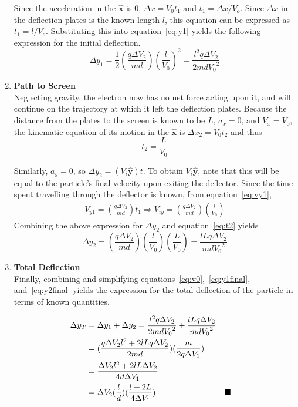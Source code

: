 \documentclass[twocolumn,english]{IEEEtran}
\theoremstyle{plain}
\theoremstyle{plain}
\begin{document}
\begin{enumerate}
 Since the acceleration in the $\mathbf{\hat{x}}$ is 0, $\Delta x = V_0 t_1$ and $t_1=\Delta x/V_o.$ Since $\Delta x$ in the deflection plates is the known length $l$, this equation can be expressed as $t_1=l/V_o$. Substituting this into equation~\eqref{eq:y1} yields the following expression for the initial deflection.
 \begin{equation}\label{eq:y1final}
  \Delta y_1 = \frac{1}{2}(\frac{q\Delta V_2}{md}){(\frac{l}{V_0})}^2 =\frac{l^2 q\Delta V_2}{2md{V_0}^2}
 \end{equation}

 \item \textbf{Path to Screen} \\
 Neglecting gravity, the electron now has no net force acting upon it, and will continue on the trajectory at which it left the deflection plates. Because the distance from the plates to the screen is known to be $L$, $a_x=0$, and $V_x=V_0$, the kinematic equation of its motion in the $\mathbf{\hat{x}}$ is $\Delta x_2=V_0 t_2$ and thus
 \begin{equation} \label{eq:t2}
 t_2 = \frac{L}{V_0}
 \end{equation}

 Similarly, $a_y=0$, so $\Delta y_2 = (V_i \mathbf{\hat{y}})t$. To obtain $V_i \mathbf{\hat{y}}$, note that this will be equal to the particle's final velocity upon exiting the deflector. Since the time spent travelling through the deflector is known, from equation~\eqref{eq:vy1},
 \begin{align*}
  V_{y1} = (\frac{q\Delta V_2}{md})t_1 \Rightarrow V_{iy}= (\frac{q\Delta V_2}{md})(\frac{l}{V_0})
 \end{align*}
  Combining the above expression for $\Delta y_2$ and equation~\eqref{eq:t2} yields
  \begin{equation} \label{eq:y2final}
   \Delta y_2 = (\frac{q\Delta V_2}{md})(\frac{l}{V_0})(\frac{L}{V_0}) = \frac{l L q\Delta V_2}{md{V_0}^2}
  \end{equation}

  \item {\textbf{Total Deflection}}\\
  Finally, combining and simplifying equations~\eqref{eq:v0},~\eqref{eq:y1final}, and~\eqref{eq:y2final} yields the expression for the total deflection of the particle in terms of known quantities.

  \begin {align*}\label{eq:final}
   \Delta y_T & = \Delta y_1 + \Delta y_2 = \frac{l^2 q\Delta V_2}{2md{V_0}^2} + \frac{l L q\Delta V_2}{md{V_0}^2} \notag \\
   & = (\frac{q \Delta V_2 l^2 + 2lLq\Delta V_2}{2md})(\frac{m}{2q\Delta V_1}) \notag \\
   & = \frac{\Delta V_2 l^2 + 2lL\Delta V_2}{4d\Delta V_1}\notag \\
   & = \Delta V_2 (\frac{l}{d})(\frac{l+2L}{4\Delta V_1}) &&\blacksquare
  \end {align*}

\end{enumerate}
\end{document}
